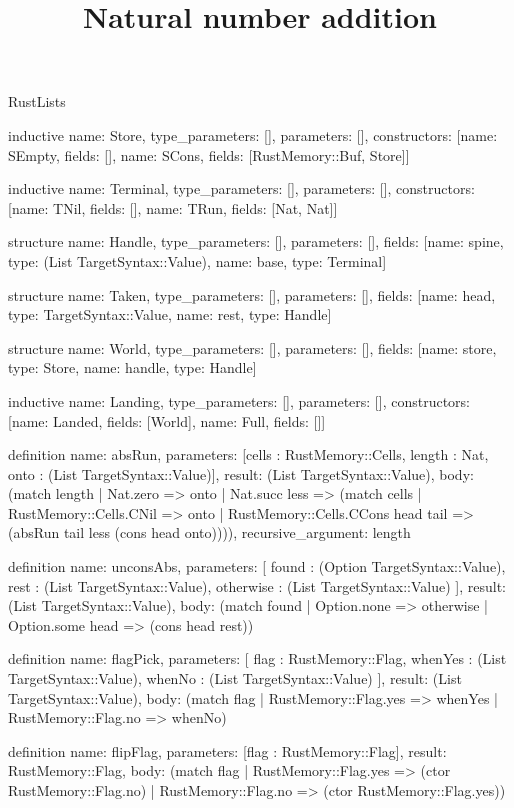 \begin{lexlean}{RustLists}
\title{Natural number addition}
\begin{semanticmodule}
inductive{
  name: Store,
  type_parameters: [],
  parameters: [],
  constructors: [{name: SEmpty, fields: []}, {name: SCons, fields: [RustMemory::Buf, Store]}]
}

inductive{
  name: Terminal,
  type_parameters: [],
  parameters: [],
  constructors: [{name: TNil, fields: []}, {name: TRun, fields: [Nat, Nat]}]
}

structure{
  name: Handle,
  type_parameters: [],
  parameters: [],
  fields: [{name: spine, type: (List TargetSyntax::Value)}, {name: base, type: Terminal}]
}

structure{
  name: Taken,
  type_parameters: [],
  parameters: [],
  fields: [{name: head, type: TargetSyntax::Value}, {name: rest, type: Handle}]
}

structure{
  name: World,
  type_parameters: [],
  parameters: [],
  fields: [{name: store, type: Store}, {name: handle, type: Handle}]
}

inductive{
  name: Landing,
  type_parameters: [],
  parameters: [],
  constructors: [{name: Landed, fields: [World]}, {name: Full, fields: []}]
}

definition{
  name: absRun,
  parameters: [cells : RustMemory::Cells, length : Nat, onto : (List TargetSyntax::Value)],
  result: (List TargetSyntax::Value),
  body: (match length
    | Nat.zero => onto
    | Nat.succ less => (match cells
      | RustMemory::Cells.CNil => onto
      | RustMemory::Cells.CCons head tail => (absRun tail less (cons head onto)))),
  recursive_argument: length
}

definition{
  name: unconsAbs,
  parameters: [
    found : (Option TargetSyntax::Value),
    rest : (List TargetSyntax::Value),
    otherwise : (List TargetSyntax::Value)
  ],
  result: (List TargetSyntax::Value),
  body: (match found | Option.none => otherwise | Option.some head => (cons head rest))
}

definition{
  name: flagPick,
  parameters: [
    flag : RustMemory::Flag,
    whenYes : (List TargetSyntax::Value),
    whenNo : (List TargetSyntax::Value)
  ],
  result: (List TargetSyntax::Value),
  body: (match flag | RustMemory::Flag.yes => whenYes | RustMemory::Flag.no => whenNo)
}

definition{
  name: flipFlag,
  parameters: [flag : RustMemory::Flag],
  result: RustMemory::Flag,
  body: (match flag
    | RustMemory::Flag.yes => (ctor RustMemory::Flag.no)
    | RustMemory::Flag.no => (ctor RustMemory::Flag.yes))
}


\end{semanticmodule}
\end{lexlean}
